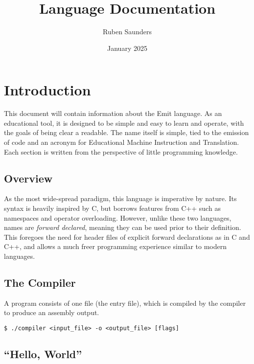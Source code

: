 \documentclass{article}
\title{Language Documentation}
\author{Ruben Saunders}
\date{January 2025}
\begin{document}
    \maketitle
    \tableofcontents

    \newpage

    \section{Introduction}\label{sec:introduction}

    This document will contain information about the Emit language.
    As an educational tool, it is designed to be simple and easy to learn and operate, with the goals of being clear a readable.
    The name itself is simple, tied to the emission of code and an acronym for Educational Machine Instruction and Translation.
    Each section is written from the perspective of little programming knowledge.

    \subsection{Overview}\label{subsec:overview}

    As the most wide-spread paradigm, this language is imperative by nature.
    Its syntax is heavily inspired by C, but borrows features from C++ such as namespaces and operator overloading.
    However, unlike these two languages, names are \textit{forward declared}, meaning they can be used prior to their definition.
    This foregoes the need for header files of explicit forward declarations as in C and C++, and allows a much freer programming experience similar to modern languages.


    \subsection{The Compiler}\label{subsec:the-compiler}

    A program consists of one file (the entry file), which is compiled by the compiler to produce an assembly output.

    \medskip
    \begin{lstlisting}[style=bashconsole]
$ ./compiler <input_file> -o <output_file> [flags]
    \end{lstlisting}
    \medskip

    \subsection{``Hello, World''}\label{subsec:hello-world}
\end{document}
